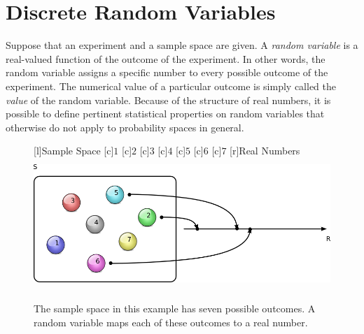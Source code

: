 \chapter{Discrete Random Variables}
\label{chapter:DiscreteRandomVariables}

Suppose that an experiment and a sample space are given.
A \emph{random variable} is a real-valued function of the outcome of the experiment. 
In other words, the random variable assigns a specific number to every possible outcome of the experiment.
The numerical value of a particular outcome is simply called the \emph{value} of the random variable. 
Because of the structure of real numbers, it is possible to define pertinent statistical properties on random variables that otherwise do not apply to probability spaces in general.

\begin{figure}[ht]
\begin{center}
\begin{psfrags}
[l]{Sample Space}
[c]{$1$}
[c]{$2$}
[c]{$3$}
[c]{$4$}
[c]{$5$}
[c]{$6$}
[c]{$7$}
[r]{Real Numbers}
\includegraphics[height=4.96cm]{Figures/5Chapter/rv}
\caption{The sample space in this example has seven possible outcomes.
A random variable maps each of these outcomes to a real number.}
\end{psfrags}
\end{center}
\end{figure}

